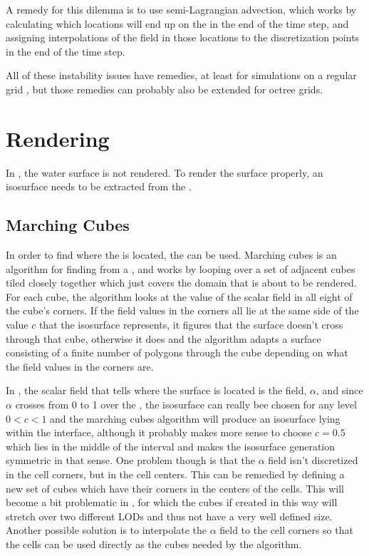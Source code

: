 A remedy for this dilemma is to use semi-Lagrangian advection, which works by calculating which locations will end up on the  in the end of the time step, and assigning interpolations of the field in those locations to the discretization points in the end of the time step.

All of these instability issues have remedies, at least for simulations on a regular grid \citep{Stam1999,Lentine2012}, but those remedies can probably also be extended for octree grids.

\section{Rendering}

In \thisprojectwork, the water surface is not rendered. To render the surface properly, an isosurface needs to be extracted from the .

\subsection{Marching Cubes}
\label{sec:marchingcubesdescription}

In order to find where the  is located, the   can be used. Marching cubes is an algorithm for finding \isosurfaces from a , and works by looping over a set of adjacent cubes tiled closely together which just covers the domain that is about to be rendered. For each cube, the algorithm looks at the value of the scalar field in all eight of the cube's corners. If the field values in the corners all lie at the same side of the value $c$ that the isosurface represents, it figures that the surface doesn't cross through that cube, otherwise it does and the algorithm adapts a surface consisting of a finite number of polygons through the cube depending on what the field values in the corners are.

In \thisprojectwork, the scalar field that tells where the surface is located is the  {field}, $\alpha$, and since $\alpha$ crosses from 0 to 1 over the \interface, the isosurface can really bee chosen for any level $0 < c < 1$ and the marching cubes algorithm will produce an isosurface lying within the interface, although it probably makes more sense to choose $c = 0.5$ which lies in the middle of the interval and makes the isosurface generation symmetric in that sense. One problem though is that the $\alpha$ field isn't discretized in the cell corners, but in the cell centers. This can be remedied by defining a new set of cubes which have their corners in the centers of the cells. This will become a bit problematic in , for which the cubes if created in this way will stretch over two different LODs and thus not have a very well defined size. Another possible solution is to interpolate the $\alpha$ field to the cell corners so that the cells can be used directly as the cubes needed by the algorithm.

